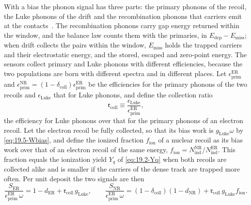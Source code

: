 With a bias the phonon signal has three parts: the primary phonons of the recoil, the Luke phonons of the drift and the recombination phonons that carriers emit at the contacts~\cite[Sect.~2]{agnese2018nuclear}. The recombination phonons carry gap energy returned within the window, and the balance law counts them with the primaries, in $E_{\mathrm{dep}} - E_{\mathrm{miss}}$; when drift collects the pairs within the window, $E_{\mathrm{miss}}$ holds the trapped carriers and their electrostatic energy, and the stored, escaped and zero-point energy. The sensors collect primary and Luke phonons with different efficiencies, because the two populations are born with different spectra and in different places. Let $\epsilon^{\mathrm{ER}}_{\mathrm{prim}}$ and $\epsilon^{\mathrm{NR}}_{\mathrm{prim}} = (1 - \delta_{\mathrm{coll}})\epsilon^{\mathrm{ER}}_{\mathrm{prim}}$ be the efficiencies for the primary phonons of the two recoils and $\epsilon_{\mathrm{Luke}}$ that for Luke phonons, and define the collection ratio
\begin{equation*}
  \mathfrak{r}_{\mathrm{coll}} \equiv \frac{\epsilon_{\mathrm{Luke}}}{\epsilon^{\mathrm{ER}}_{\mathrm{prim}}} ,
\end{equation*}
the efficiency for Luke phonons over that for the primary phonons of an electron recoil. Let the electron recoil be fully collected, so that its bias work is $g_{\mathrm{Luke}}\omega$ by \cref{eq:19.5-Wbias}, and define the ionized fraction $f_{\mathrm{ion}}$ of a nuclear recoil as its bias work over that of an electron recoil of the same energy, $f_{\mathrm{ion}} = N^{\mathrm{NR}}_{\mathrm{ind}}/N^{\mathrm{ER}}_{\mathrm{ind}}$. This fraction equals the ionization yield $Y_q$ of \cref{eq:19.2-Yq} when both recoils are collected alike and is smaller if the carriers of the dense track are trapped more often. Per unit deposit the two signals are then
\begin{equation}
  \frac{S_{\mathrm{ER}}}{\epsilon^{\mathrm{ER}}_{\mathrm{prim}}\,\omega} = 1 - d_{\mathrm{ER}} + \mathfrak{r}_{\mathrm{coll}}\,g_{\mathrm{Luke}} , \qquad
  \frac{S_{\mathrm{NR}}}{\epsilon^{\mathrm{ER}}_{\mathrm{prim}}\,\omega} = (1 - \delta_{\mathrm{coll}})(1 - d_{\mathrm{NR}}) + \mathfrak{r}_{\mathrm{coll}}\,g_{\mathrm{Luke}}f_{\mathrm{ion}} .
  \label{eq:19.5-signal}
\end{equation}

